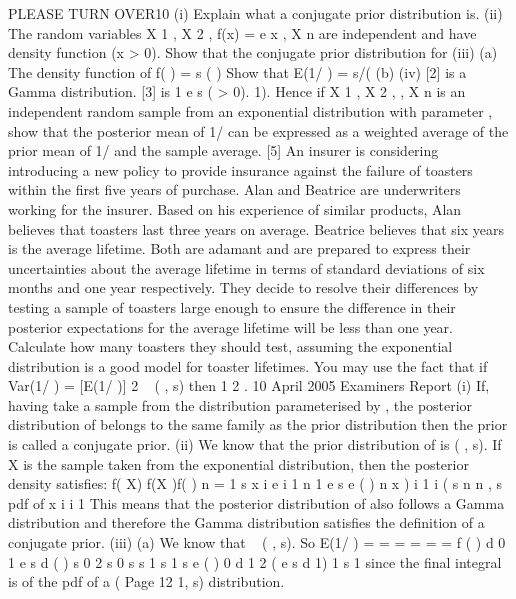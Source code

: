 \documentclass[a4paper,12pt]{article}
\begin{document}
\begin{enumerate}

PLEASE TURN OVER10
(i) Explain what a conjugate prior distribution is.
(ii) The random variables X 1 , X 2 ,
f(x) = e
x
, X n are independent and have density function
(x > 0).
Show that the conjugate prior distribution for
(iii)
(a)
The density function of
f( ) =
s
( )
Show that E(1/ ) = s/(
(b)
(iv)
[2]
is a Gamma distribution.
[3]
is
1
e
s
( > 0).
1).
Hence if X 1 , X 2 , , X n is an independent random sample from an exponential distribution with parameter , show that the posterior
mean of 1/ can be expressed as a weighted average of the prior mean of 1/ and the sample average.
[5]
An insurer is considering introducing a new policy to provide insurance
against the failure of toasters within the first five years of purchase. Alan and Beatrice are underwriters working for the insurer. Based on his experience of
similar products, Alan believes that toasters last three years on average. Beatrice believes that six years is the average lifetime. Both are adamant and
are prepared to express their uncertainties about the average lifetime in terms of standard deviations of six months and one year respectively. They decide
to resolve their differences by testing a sample of toasters large enough to ensure the difference in their posterior expectations for the average lifetime
will be less than one year.
Calculate how many toasters they should test, assuming the exponential distribution is a good model for toaster lifetimes.
You may use the fact that if
Var(1/ ) = [E(1/ )] 2
~ ( , s) then
1
2
.
10
April 2005
Examiners Report
(i) If, having take a sample from the distribution parameterised by , the posterior distribution of belongs to the same family as the prior distribution then the
prior is called a conjugate prior.
(ii) We know that the prior distribution of is ( , s). If X is the sample taken from the exponential distribution, then the posterior density satisfies:
f( X)
f(X )f( )
n
=
1
s
x i
e
i 1
n 1
e
s
e
( )
n
x )
i 1 i
( s
n
n , s
pdf of
x i
i 1
This means that the posterior distribution of also follows a Gamma
distribution and therefore the Gamma distribution satisfies the definition of a
conjugate prior.
(iii)
(a)
We know that
~ ( , s). So
E(1/ ) =
=
=
=
=
=
f ( )
d
0
1
e s
d
( )
s
0
2
s
0
s
s
1
s
1
s
e
( )
0
d
1
2
(
e s
d
1)
1
s
1
since the final integral is of the pdf of a (
Page 12
1, s) distribution.


\end{enumerate}
\end{document}
